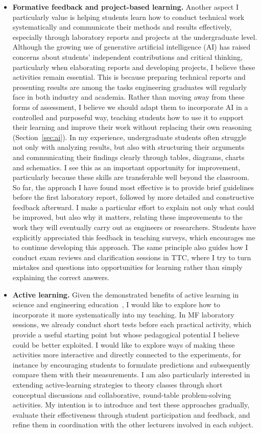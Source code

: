 \documentclass[11pt]{article}
\newcommand{\NEW}[1]{\iffinal #1\else{\color{red}#1}\fi}
\begin{document}
\begin{itemize}
  \item \textbf{Formative feedback and project-based learning.}
  Another aspect I particularly value is helping students learn how to conduct technical work systematically and communicate their methods and results effectively, especially through laboratory reports and projects at the undergraduate level. 
  Although the growing use of generative \NEW{artificial intelligence (AI)} has raised concerns about students' independent contributions and critical thinking, particularly when elaborating reports and developing projects, I believe these activities remain essential. 
  This is because preparing technical reports and presenting results are among the tasks engineering graduates will regularly face in both industry and academia. 
  Rather than moving away from these forms of assessment, I believe we should adapt them to incorporate AI in a controlled and purposeful way, teaching students how to use it to support their learning and improve their work without replacing their own reasoning (Section~\ref{sec:ai}).
  In my experience, undergraduate students often struggle not only with analyzing results, but also with structuring their arguments and communicating their findings clearly through tables, diagrams, charts and schematics. I see this as an important opportunity for improvement, particularly because these skills are transferable well beyond the classroom.
  So far, the approach I have found most effective is to provide brief guidelines before the first laboratory report, followed by more detailed and constructive feedback afterward. 
  I make a particular effort to explain not only what could be improved, but also why it matters, relating these improvements to the work they will eventually carry out as engineers or researchers. 
  Students have explicitly appreciated this feedback in teaching surveys, which encourages me to continue developing this approach. 
  The same principle also guides how I conduct exam reviews and clarification sessions in TTC, where I try to turn mistakes and questions into opportunities for learning rather than simply explaining the correct answers.
  
  \item \textbf{Active learning.}
  Given the demonstrated benefits of active learning in science and engineering education~\cite{Freeman2014}, I would like to explore how to incorporate it more systematically into my teaching. 
  In MF laboratory sessions, we already conduct short tests before each practical activity, which provide a useful starting point but whose pedagogical potential I believe could be better exploited. 
  I would like to explore ways of making these activities more interactive and directly connected to the experiments, for instance by encouraging students to formulate predictions and subsequently compare them with their measurements. 
  I am also particularly interested in extending active-learning strategies to theory classes through short conceptual discussions and collaborative, round-table problem-solving activities. 
  My intention is to introduce and test these approaches gradually, evaluate their effectiveness through student participation and feedback, and refine them in coordination with the other lecturers involved in each subject.


\end{itemize}
\end{document}
